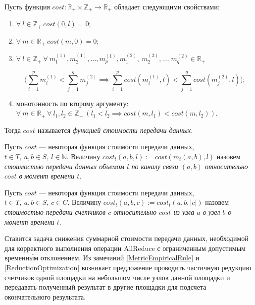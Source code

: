 \begin{definition}
\label{CostFunctionDefinition}
    Пусть функция $cost \colon \mathbb{R}_{+} \times \mathbb{Z}_{+} \to \mathbb{R}_{+}$ обладает следующими свойствами:
    \begin{enumerate}
        \item $\forall\ l \in \mathbb{Z}_{+}\ cost(0, l) = 0$;
        
        \item $\forall\ m \in \mathbb{R}_{+}\ cost(m, 0) = 0$;
        
        \item $\forall\ l \in \mathbb{Z}_{+}\ \forall\ m_1^{(1)}, m_2^{(1)}, \ldots, m_p^{(1)}, m_1^{(2)},\ m_2^{(2)}, \ldots, m_q^{(2)} \in \mathbb{R}_{+}$ 
        
        \begin{equation*}
            \Big( \displaystyle \sum_{i = 1}^p m_i^{(1)} < \displaystyle \sum_{j = 1}^q m_j^{(2)} \implies \displaystyle \sum_{i = 1}^p cost(m_i^{(1)}, l) < \displaystyle \sum_{j = 1}^q cost(m_j^{(2)}, l) \Big);
        \end{equation*}
        
        \item монотонность по второму аргументу: $\forall\ m \in \mathbb{R}_{+}\ \forall\ l_1, l_2 \in \mathbb{Z}_{+}\ (l_1 < l_2 \implies cost(m, l_1) < cost(m, l_2))$.
    \end{enumerate}
    Тогда $cost$ называется \textit{функцией стоимости передачи данных}.
\end{definition}

\begin{definition}
    Пусть $cost$ --- некоторая функция стоимости передачи данных, $t \in T,\ a, b \in S,\ l \in \mathbb{N}$. Величину $cost_t(a, b, l) := cost(m_t(a, b), l)$ назовем \textit{стоимостью передачи данных объемом $l$ по каналу связи $(a, b)$ относительно $cost$ в момент времени $t$}.
\end{definition}

\begin{definition}
    Пусть $cost$ --- некоторая функция стоимости передачи данных, $t \in T,\ a, b \in S,\ c \in C$. Величину $cost_t(a, b, c) := cost_t(a, b, |c|)$ назовем \textit{стоимостью передачи счетчиков $c$ относительно $cost$ из узла $a$ в узел $b$ в момент времени $t$}.
\end{definition}

Ставится задача снижения суммарной стоимости передачи данных, необходимой для корректного выполнения операции AllReduce с ограниченным допустимым временн\'{ы}м отклонением. Из замечаний \ref{MetricEmpiricalRule} и \ref{ReductionOptimization} возникает предложение проводить частичную редукцию счетчиков одной площадки на небольшом числе узлов данной площадки и передавать полученный результат в другие площадки для подсчета окончательного результата.

